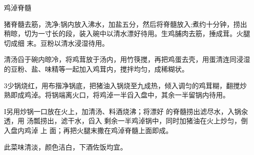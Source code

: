 \begin{recipe}{鸡淖脊髓}

\ingredients


\preparation

\step 猪脊髓去筋，洗净;锅内放入沸水，加盐五分，然后将脊髓放入;煮约十分钟，捞出
稍晾，切为一寸长的段，装入碗中以清水漂好待用。生鸡脯肉去筋，捶成茸。火腿切成细
末。豆粉以清水浸湿待用。

\step 清汤舀于碗内晾冷，将鸡茸放于汤内，用竹筷搅，再把鸡蛋去壳，用蛋清连同浸湿
的豆粉、盐、味精等一起加入鸡茸内，搅拌均匀，成稀糊状。

\step 3少锅烧红，用布揩净锅底，把猪油入锅烧至九成热，倾入调匀的鸡茸糊，翻搅炒
熟即成鸡淖。将锅端离火口，将鸡淖一半舀入盘中，其余一半留锅内待用。

I另用炒锅一口放在火上，加清汤、料酒烧沸；将漂好 的脊髓捞出滤尽水，入锅汆透，用
汤瓢捞出，滤干水，舀入 剩余一半鸡淖锅中，同时加猪油在火上炒匀，倒入盘内鸡淖 上
面；再把火腿末撒在鸡淖脊髓上面即成。

\features

此菜味清淡，颜色洁白，下酒佐饭均宜。

\end{recipe}

